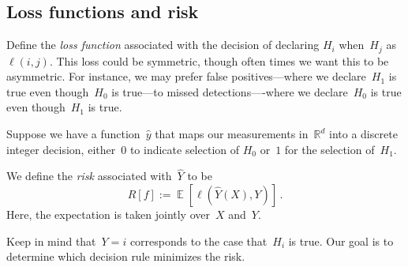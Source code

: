 \documentclass{tufte-book}
\begin{document}
\hypertarget{loss-functions-and-risk}{%
\subsection{Loss functions and risk}\label{loss-functions-and-risk}}

Define the \emph{loss function} associated with the decision of
declaring \(H_i\) when~\(H_j\) as~\(\ell(i,j)\). This loss could be
symmetric, though often times we want this to be asymmetric. For
instance, we may prefer false positives---where we declare~\(H_1\) is
true even though~\(H_0\) is true---to missed detections----where we
declare~\(H_0\) is true even though~\(H_1\) is
true.

Suppose we have a function~\(\hat y\) that maps our measurements
in~\(\mathbb{R}^d\) into a discrete integer decision, either~\(0\) to
indicate selection of \(H_0\) or~\(1\) for the selection of~\(H_1\).

\begin{Definition}

We define the \emph{risk} associated with~\(\hat{Y}\) to be \[
    R[f] := \mathop\mathbb{E}[\ell(\hat{Y}(X),Y)]\,.
\] Here, the expectation is taken jointly over~\(X\) and~\(Y.\)

\end{Definition}

Keep in mind that~\(Y=i\) corresponds to the case that~\(H_i\) is true.
Our goal is to determine which decision rule minimizes the
risk.
\end{document}
